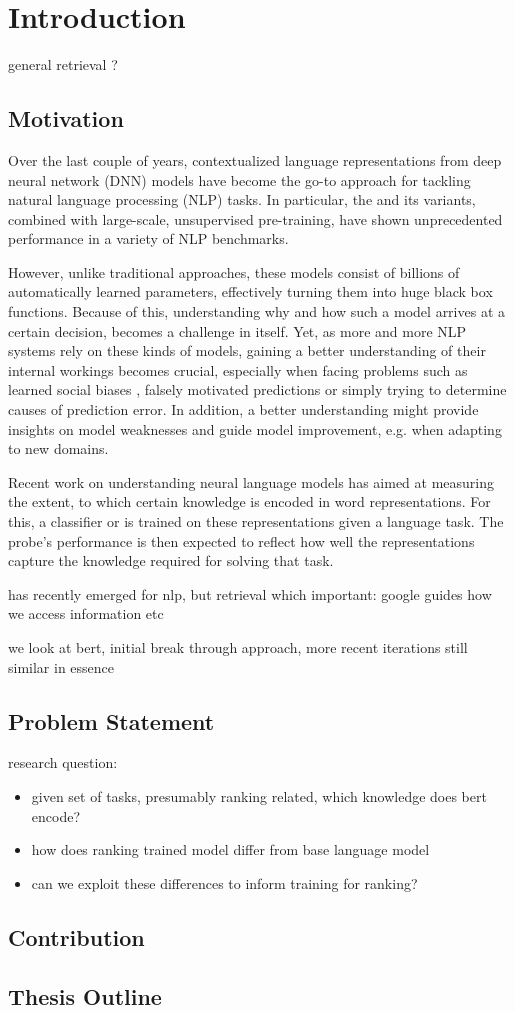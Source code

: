 \chapter{Introduction}
general retrieval ?
\section{Motivation}
Over the last couple of years, contextualized language representations from deep neural network (DNN) models have become the go-to approach for tackling natural language processing (NLP) tasks. In particular, the  \cite{vaswani2017attention} and its variants, combined with large-scale, unsupervised pre-training, have shown unprecedented performance in a variety of NLP benchmarks.

However, unlike traditional approaches, these models consist of billions of automatically learned parameters, effectively turning them into huge black box functions. Because of this, understanding why and how such a model arrives at a certain decision, becomes a challenge in itself. Yet, as more and more NLP systems rely on these kinds of models, gaining a better understanding of their internal workings becomes crucial, especially when facing problems such as learned social biases \cite{Nadeem2021StereoSetMS,Bender2021OnTD, kurita2019measuring}, falsely motivated predictions \cite{10.1145/2939672.2939778, DBLP:journals/corr/abs-1802-00614} or simply trying to determine causes of prediction error. In addition, a better understanding might provide insights on model weaknesses and guide model improvement, e.g. when adapting to new domains.

Recent work on understanding neural language models has aimed at measuring the extent, to which certain knowledge is encoded in word representations. For this, a  classifier or  is trained on these representations given a language task. The probe's performance is then expected to reflect how well the representations capture the knowledge required for solving that task.

has recently emerged for nlp, but retrieval which important: google guides how we access information etc

we look at bert, initial break through approach, more recent iterations still similar in essence

\section{Problem Statement}
research question:
\begin{itemize}
    \item given set of tasks, presumably ranking related, which knowledge does bert encode?
    \item how does ranking trained model differ from base language model
    \item can we exploit these differences to inform training for ranking?
\end{itemize}
\section{Contribution}

\section{Thesis Outline}
